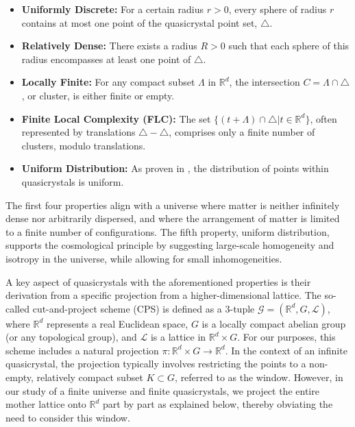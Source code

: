 \documentclass{article}
\begin{document}
\begin{itemize}
    \item \textbf{Uniformly Discrete:} For a certain radius \( r > 0 \), every sphere of radius \( r \) contains at most one point of the quasicrystal point set, \( \triangle \).
    \item \textbf{Relatively Dense:} There exists a radius \( R > 0 \) such that each sphere of this radius encompasses at least one point of \( \triangle \).
    \item \textbf{Locally Finite:} For any compact subset \( \varLambda \) in \( \mathbb{R}^{d} \), the intersection \( C = \varLambda \cap \triangle \), or cluster, is either finite or empty.
    \item \textbf{Finite Local Complexity (FLC):} The set \( \{ (t + \varLambda) \cap \triangle | t \in \mathbb{R}^{d} \} \), often represented by translations \( \triangle - \triangle \), comprises only a finite number of clusters, modulo translations.
    \item \textbf{Uniform Distribution:} As proven in \cite{BaakeGrimm}, the distribution of points within quasicrystals is uniform.
\end{itemize}
The first four properties align with a universe where matter is neither infinitely dense nor arbitrarily dispersed, and where the arrangement of matter is limited to a finite number of configurations. The fifth property, uniform distribution, supports the cosmological principle by suggesting large-scale homogeneity and isotropy in the universe, while allowing for small inhomogeneities.


A key aspect of quasicrystals with the aforementioned properties is their derivation from a specific projection from a higher-dimensional lattice. The so-called cut-and-project scheme (CPS) is defined as a 3-tuple \( \mathcal{G} = (\mathbb{R}^{d}, G, \mathcal{L}) \), where \( \mathbb{R}^{d} \) represents a real Euclidean space, \( G \) is a locally compact abelian group (or any topological group), and \( \mathcal{L} \) is a lattice in \( \mathbb{R}^{d} \times G \). For our purposes, this scheme includes a natural projection \( \pi: \mathbb{R}^{d} \times G \rightarrow \mathbb{R}^{d} \). In the context of an infinite quasicrystal, the projection typically involves restricting the points to a non-empty, relatively compact subset \( K \subset G \), referred to as the window. However, in our study of a finite universe and finite quasicrystals, we project the entire mother lattice onto \( \mathbb{R}^{d} \) part by part as explained below, thereby obviating the need to consider this window.
\end{document}
